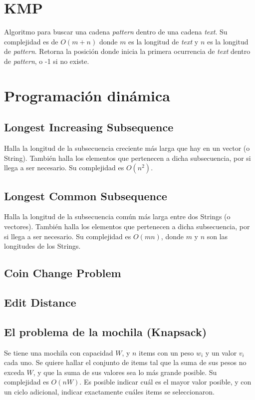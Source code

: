 \documentclass{article}
\begin{document}
\begin{multicols}{2}
\section{KMP}
Algoritmo para buscar una cadena \emph{pattern} dentro de una cadena \emph{text}. Su complejidad es de \( O(m+n) \) donde \( m \) es la longitud de \emph{text} y \( n \) es la longitud de \emph{pattern}. Retorna la posición donde inicia la primera ocurrencia de \emph{text} dentro de \emph{pattern}, o -1 si no existe.


\section{Programación dinámica}
	\subsection{Longest Increasing Subsequence}
		Halla la longitud de la subsecuencia creciente más larga que hay en un vector (o String). También halla los elementos que pertenecen a dicha subsecuencia, por si llega a ser necesario. Su complejidad es \( O(n^2) \).
		
	\subsection{Longest Common Subsequence}
		Halla la longitud de la subsecuencia común más larga entre dos Strings (o vectores). También halla los elementos que pertenecen a dicha subsecuencia, por si llega a ser necesario. Su complejidad es \( O(mn) \), donde \( m \) y \( n \) son las longitudes de los Strings.
		
	\subsection{Coin Change Problem}
	\subsection{Edit Distance}
	\subsection{El problema de la mochila (Knapsack)}
	Se tiene una mochila con capacidad \( W \), y \( n \) items con un peso \( w_i \) y un valor \( v_i \) cada uno. Se quiere hallar el conjunto de items tal que la suma de sus pesos no exceda \( W \), y que la suma de sus valores sea lo más grande posible. Su complejidad es \( O(nW) \). Es posible indicar cuál es el mayor valor posible, y con un ciclo adicional, indicar exactamente cuáles items se seleccionaron.
	


\end{multicols}
\end{document}
